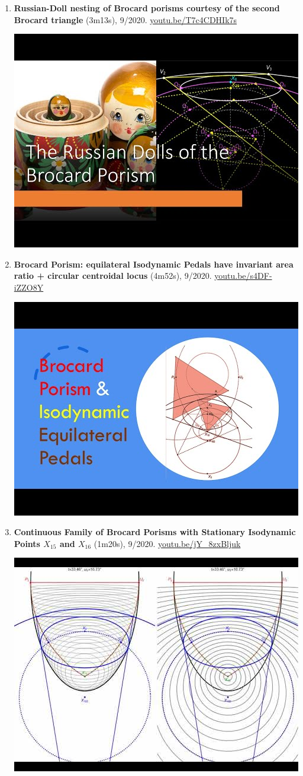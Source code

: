 \documentclass[12pt]{article}
\begin{document}
\begin{enumerate}[resume]
% 
\item \textbf{Russian-Doll nesting of Brocard porisms courtesy of the second Brocard triangle} (3m13s), 9/2020. \href{https://youtu.be/T7c4CDHIk7s}{\url{youtu.be/T7c4CDHIk7s}}
\begin{center}\includegraphics[width=.5\textwidth]{pics/T7c4CDHIk7s.jpg}\end{center}
% 
\item \textbf{Brocard Porism: equilateral Isodynamic Pedals have invariant area ratio + circular centroidal locus} (4m52s), 9/2020. \href{https://youtu.be/s4DF-iZZO8Y}{\url{youtu.be/s4DF-iZZO8Y}}
\begin{center}\includegraphics[width=.5\textwidth]{pics/s4DF-iZZO8Y.jpg}\end{center}
% 
\item \textbf{Continuous Family of Brocard Porisms with Stationary Isodynamic Points $X_{15}$ and $X_{16}$} (1m20s), 9/2020. \href{https://youtu.be/jY_8zxBljuk}{\url{youtu.be/jY\_8zxBljuk}}
\begin{center}\includegraphics[width=.5\textwidth]{pics/jY_8zxBljuk.jpg}\end{center}

\end{enumerate}
\end{document}
